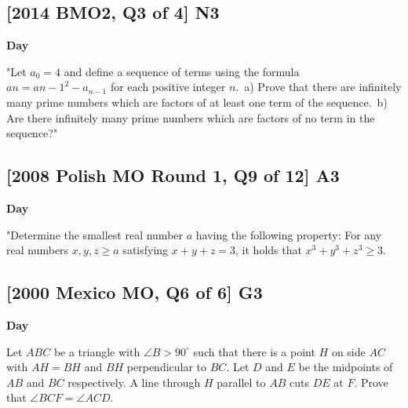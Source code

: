 \documentclass[10pt]{article}
\newcommand{\themonth}{March}
\newcommand{\theyear}{2019}
\newcounter{day}
\newcounter{solution}
\newcounter{datenumber}
\newcommand{\problem}[4][0]{
	\newpage
	\subsection{[#3] \space #2} \hfill 
	{\large\textbf{Day \arabic{day}}} %
	\begin{flushleft} #4 \end{flushleft}
	\vspace{1em}
	\addtocounter{day}{1}
	\addtocounter{datenumber}{1}
	\setcounter{solution}{1}
}
\begin{document}
\problem[50]{N3}{2014 BMO2, Q3 of 4}{"Let $a_0 = 4$ and define a sequence of terms using the formula $an = a{n-1}^2 - a_{n-1}$ for each positive integer $n$.\
	a) Prove that there are infinitely many prime numbers which are factors of at least one term of the sequence.\
	b) Are there infinitely many prime numbers which are factors of no term in the sequence?"}

\problem[51]{A3}{2008 Polish MO Round 1, Q9 of 12}{"Determine the smallest real number $a$ having the following property: For any real numbers $x,y,z \geq a$ satisfying $x+y+z = 3$, it holds that $x^3 + y^3 + z^3 \geq 3$.}

\problem[52]{G3}{2000 Mexico MO, Q6 of 6}{Let $ABC$ be a triangle with $\angle B > 90^{\circ}$ such that there is a point $H$ on side $AC$ with $AH = BH$ and $BH$ perpendicular to $BC$. Let $D$ and $E$ be the midpoints of $AB$ and $BC$ respectively. A line through $H$ parallel to $AB$ cuts $DE$ at $F$. Prove that $\angle BCF = \angle ACD$.}
\end{document}
